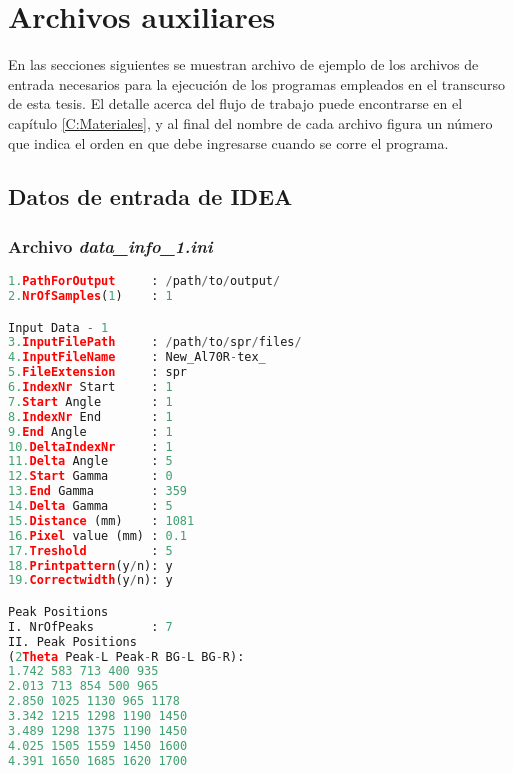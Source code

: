 \chapter{Archivos auxiliares}\label{CA:input}
\graphicspath{{figs/Apendice}}
En las secciones siguientes se muestran archivo de ejemplo de los archivos de entrada necesarios para la ejecución de los programas empleados en el transcurso de esta tesis.
El detalle acerca del flujo de trabajo puede encontrarse en el capítulo \ref{C:Materiales}, y al final del nombre de cada archivo figura un número que indica el orden en que debe ingresarse cuando se corre el programa.
\section{Datos de entrada de IDEA}
\hypertarget{datainfo}{}
\subsection{Archivo \textit{data\_info\_1.ini}}
\begin{lstlisting}[language=Python]
1.PathForOutput     : /path/to/output/
2.NrOfSamples(1)    : 1

Input Data - 1
3.InputFilePath     : /path/to/spr/files/
4.InputFileName     : New_Al70R-tex_
5.FileExtension     : spr
6.IndexNr Start     : 1
7.Start Angle       : 1
8.IndexNr End       : 1
9.End Angle         : 1
10.DeltaIndexNr     : 1
11.Delta Angle      : 5
12.Start Gamma      : 0
13.End Gamma        : 359
14.Delta Gamma      : 5
15.Distance (mm)    : 1081
16.Pixel value (mm) : 0.1
17.Treshold         : 5
18.Printpattern(y/n): y
19.Correctwidth(y/n): y

Peak Positions
I. NrOfPeaks        : 7
II. Peak Positions
(2Theta Peak-L Peak-R BG-L BG-R):
1.742 583 713 400 935
2.013 713 854 500 965
2.850 1025 1130 965 1178
3.342 1215 1298 1190 1450
3.489 1298 1375 1190 1450
4.025 1505 1559 1450 1600
4.391 1650 1685 1620 1700
\end{lstlisting}

\hypertarget{fitini}{}

